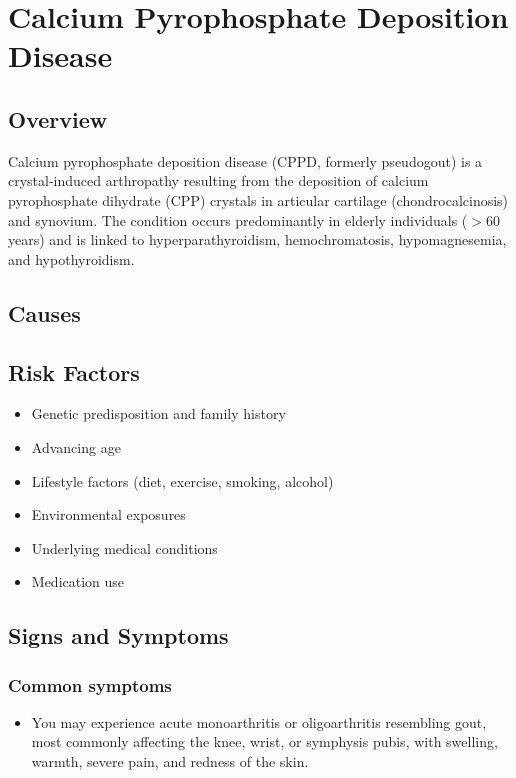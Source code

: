 \chapter{Calcium Pyrophosphate Deposition Disease}
\label{sec:Calcium Pyrophosphate Deposition Disease}

\section{Overview}
Calcium pyrophosphate deposition disease (CPPD, formerly pseudogout) is a crystal-induced arthropathy resulting from the deposition of calcium pyrophosphate dihydrate (CPP) crystals in articular cartilage (chondrocalcinosis) and synovium. The condition occurs predominantly in elderly individuals ($>60$ years) and is linked to hyperparathyroidism, hemochromatosis, hypomagnesemia, and hypothyroidism.
\section{Causes}
\section{Risk Factors}

\begin{itemize}[noitemsep]
  \item Genetic predisposition and family history
  \item Advancing age
  \item Lifestyle factors (diet, exercise, smoking, alcohol)
  \item Environmental exposures
  \item Underlying medical conditions
  \item Medication use
\end{itemize}
\section{Signs and Symptoms}

\subsection{Common symptoms}
\begin{itemize}[noitemsep]
  \item You may experience acute monoarthritis or oligoarthritis resembling gout, most commonly affecting the knee, wrist, or symphysis pubis, with swelling, warmth, severe pain, and redness of the skin. 
  \end{itemize}


